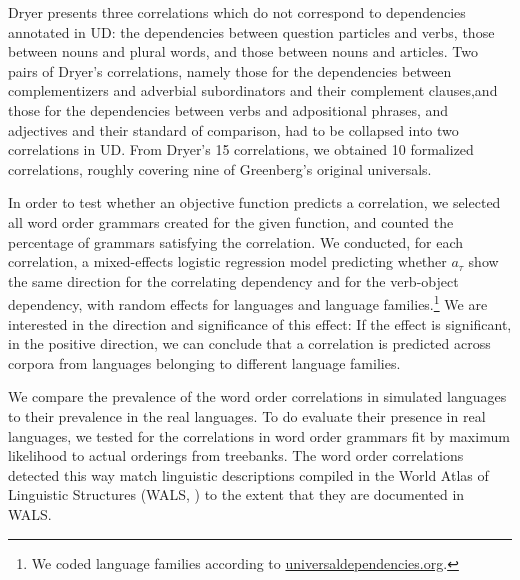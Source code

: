 \documentclass[9pt,twocolumn,twoside,lineno]{pnas-new}
\begin{document}
Dryer \cite{dryer1992greenbergian} presents three correlations which do not correspond to dependencies annotated in UD: the dependencies between question particles and verbs, those between nouns and plural words, and those between nouns and articles. Two pairs of Dryer's correlations, namely those for the dependencies between complementizers and adverbial subordinators and their complement clauses,and those for the dependencies between verbs and adpositional phrases, and adjectives and their standard of comparison, had to be collapsed into two correlations in UD. From Dryer's 15 correlations, we obtained 10 formalized correlations, roughly covering nine of Greenberg's original universals. %

In order to test whether an objective function predicts a correlation, we selected all word order grammars created for the given function, and counted the percentage of grammars satisfying the correlation.
We conducted, for each correlation, a mixed-effects logistic regression model predicting whether $a_\tau$ show the same direction for the correlating dependency and for the verb-object dependency, with random effects for languages and language families.\footnote{We coded language families according to \url{universaldependencies.org}.}
We are interested in the direction and significance of this effect: 
If the effect is significant, in the positive direction, we can conclude that a correlation is predicted across corpora from languages belonging to different language families.

We compare the prevalence of the word order correlations in simulated languages to their prevalence in the real languages. To do evaluate their presence in real languages, we tested for the correlations in word order grammars fit by maximum likelihood to actual orderings from treebanks. The word order correlations detected this way match linguistic descriptions compiled in the World Atlas of Linguistic Structures (WALS, \cite{wals}) to the extent that they are documented in WALS. %
\end{document}
